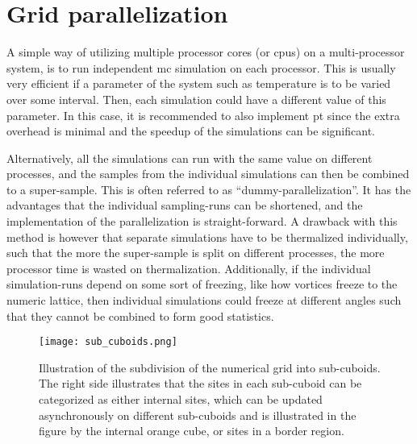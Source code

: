 \section{Grid parallelization}

A simple way of utilizing multiple processor cores (or cpus) on a multi-processor system, is to run independent \ac{mc} simulation on each processor. This
is usually very efficient if a parameter of the system such as temperature is to be varied over some interval. Then, each simulation could have a
different value of this parameter. In this case, it is recommended to also implement \ac{pt} since the extra overhead is minimal and the
speedup of the simulations can be significant.

Alternatively, all the simulations can run with the same value on different processes, and the samples from the individual simulations can then
be combined to a super-sample. This is often referred to as ``dummy-parallelization''. It has the advantages that the individual sampling-runs can
be shortened, and the implementation of the parallelization
is straight-forward. A drawback with this method is however that separate simulations have to be thermalized individually, such that the more the
super-sample is split on different processes, the more processor time is wasted on thermalization. Additionally, if the individual simulation-runs
depend on some sort of freezing, like how vortices freeze to the numeric lattice, then individual simulations could freeze at different
angles such that they cannot be combined to form good statistics.

\begin{figure}[t]
    \centering
    \texttt{[image: sub\_cuboids.png]}
    \caption{Illustration of the subdivision of the numerical grid into sub-cuboids. The right side illustrates that the sites in each sub-cuboid
    can be categorized as either internal sites, which can be updated asynchronously on different sub-cuboids and is illustrated in the figure
    by the internal orange cube, or sites in a border region.}
    \label{fig:Monte:numerical_grid}
\end{figure}

